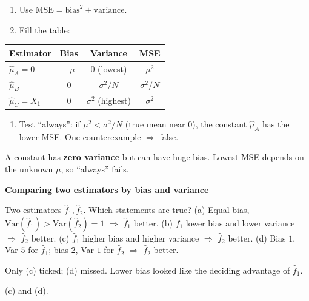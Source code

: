 \documentclass[11pt,a4paper]{article}
\newcommand{\keep}[1]{\par
  \ifdim\dimexpr\pagegoal-\pagetotal\relax<#1\relax\newpage\fi}
\newcommand{\sub}[1]{\keep{6cm}\medskip
  {\sffamily\bfseries\large\color{accent}#1}\par\smallskip}
\begin{document}
\begin{steps}
\begin{enumerate}[leftmargin=*]
  \item Use $\mathrm{MSE}=\text{bias}^2+\text{variance}$.
  \item Fill the table:
\end{enumerate}
\centering\small
\begin{tabular}{@{}lccc@{}}
  \toprule
  Estimator & Bias & Variance & MSE \\
  \midrule
  $\hat\mu_A=0$ & $-\mu$ & $0$ (lowest) & $\mu^2$ \\
  $\hat\mu_B$ & $0$ & $\sigma^2/N$ & $\sigma^2/N$ \\
  $\hat\mu_C=X_1$ & $0$ & $\sigma^2$ (highest) & $\sigma^2$ \\
  \bottomrule
\end{tabular}
\begin{enumerate}[leftmargin=*, start=3]
  \item Test ``always'': if $\mu^2<\sigma^2/N$ (true mean near $0$), the constant
        $\hat\mu_A$ has the lower MSE. One counterexample $\Rightarrow$ false.
\end{enumerate}
\end{steps}

\begin{hook}
A constant has \textbf{zero variance} but can have huge bias. Lowest MSE depends
on the unknown $\mu$, so ``always'' fails.
\end{hook}

\sub{Comparing two estimators by bias and variance}

\begin{question}
Two estimators $\hat f_1,\hat f_2$. Which statements are true?
(a) Equal bias, $\mathrm{Var}(\hat f_1)>\mathrm{Var}(\hat f_2)=1$ $\Rightarrow$
$\hat f_1$ better.
(b) $\hat f_1$ lower bias and lower variance $\Rightarrow$ $\hat f_2$ better.
(c) $\hat f_1$ higher bias and higher variance $\Rightarrow$ $\hat f_2$ better.
(d) Bias $1$, Var $5$ for $\hat f_1$; bias $2$, Var $1$ for $\hat f_2$
$\Rightarrow$ $\hat f_2$ better.
\end{question}
\begin{yours}
Only (c) ticked; (d) missed. Lower bias looked like the deciding advantage of
$\hat f_1$.
\end{yours}
\begin{correct}
(c) and (d).
\end{correct}
\end{document}
